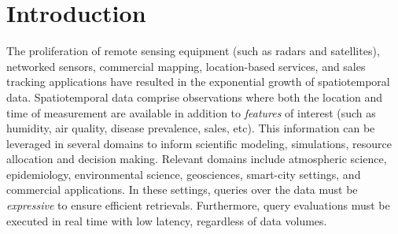 \section{Introduction}
\label{sec:introduction}
The proliferation of remote sensing equipment (such as radars and satellites), networked sensors, commercial mapping, location-based services, and sales tracking applications have resulted in the exponential growth of spatiotemporal data. Spatiotemporal data comprise observations where both the location and time of measurement are available in addition to \emph{features} of interest (such as humidity, air quality, disease prevalence, sales, etc). This information can be leveraged in several domains to inform scientific modeling, simulations, resource allocation and decision making. Relevant domains include atmospheric science, epidemiology, environmental science, geosciences, smart-city settings, and commercial applications. In these settings, queries over the data must be \emph{expressive} to ensure efficient retrievals. Furthermore, query evaluations must be executed in real time with low latency, regardless of data volumes.

